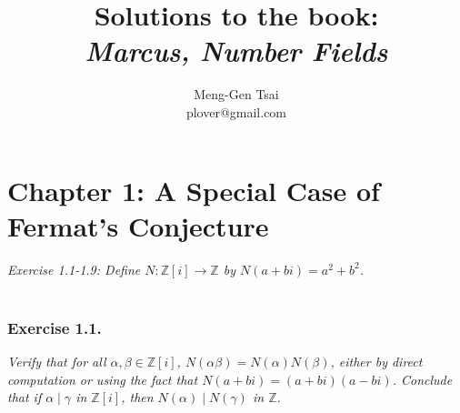 \documentclass{article}
\title{\textbf{Solutions to the book: \\ \emph{Marcus, Number Fields}}}
\author{Meng-Gen Tsai \\ plover@gmail.com}
\begin{document}
\maketitle
\tableofcontents












\newpage
\section*{Chapter 1: A Special Case of Fermat's Conjecture \\}



\emph{Exercise 1.1-1.9: Define $N: \mathbb{Z}[i] \rightarrow \mathbb{Z}$ by
$N(a+bi) = a^2 + b^2$.} \\\\



\subsubsection*{Exercise 1.1.}
\emph{Verify that for all $\alpha, \beta \in \mathbb{Z}[i]$,
$N(\alpha\beta) = N(\alpha)N(\beta)$,
either by direct computation or using the fact that
$N(a+bi) = (a+bi)(a-bi)$.
Conclude that if $\alpha \mid \gamma$ in $\mathbb{Z}[i]$,
then $N(\alpha) \mid N(\gamma)$ in $\mathbb{Z}$.} \\
\end{document}
